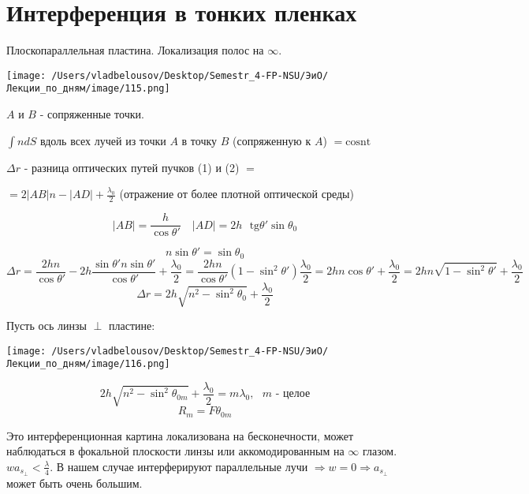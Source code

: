 \documentclass[12pt, a4paper]{report}
\begin{document}
\section{Интерференция в тонких пленках}

Плоскопараллельная пластина. Локализация полос на \( \infty  \). 

\begin{center}
    \texttt{[image: /Users/vladbelousov/Desktop/Semestr\_4-FP-NSU/ЭиО/Лекции\_по\_дням/image/115.png]}
\end{center}
\( A \) и \( B \) - сопряженные точки.

\( \int n d S  \) вдоль всех лучей из точки \( A \) в точку \( B \)  (сопряженную к \( A \)) \( = \mathrm{cosnt}   \) 

\( \Delta r  \)  - разница оптических путей пучков (1) и (2) \( = \) 

\( = 2 |AB|n - \displaystyle  |AD| + \frac{\lambda_0}{2}  \) (отражение от более плотной оптической среды)

\[ |AB | = \frac{h}{\cos \theta' } \quad  |AD| = 2 h \text{ } \mathrm{ tg}   \theta ' \sin  \theta_0 \]  

\[  n \sin \theta ' = \sin \theta_0  \] 
\[ \Delta r = \frac{2hn}{\cos \theta ' }- 2h \frac{\sin  \theta ' n \sin \theta ' }{\cos \theta ' }+ \frac{\lambda_0}{2 }  = \frac{2hn}{\cos  \theta' } (1 - \sin  ^2 \theta ' ) \frac{\lambda_0}{2 }  = 2hn \cos \theta ' + \frac{\lambda_0}{2 }  = 2hn \sqrt{1 - \sin  ^2 \theta ' }   + \frac{\lambda_0}{2 }   \] 
\[ \Delta r = 2 h \sqrt{n ^2 - \sin  ^2 \theta_0 } + \frac{\lambda_0}{2 }  \] 

Пусть ось линзы \( \perp   \) пластине: 

\begin{center}
    \texttt{[image: /Users/vladbelousov/Desktop/Semestr\_4-FP-NSU/ЭиО/Лекции\_по\_дням/image/116.png]}
\end{center}



\[ 2 h \sqrt{n ^2 - \sin  ^2 \theta_{0m }  } + \frac{\lambda_0}{2 }  = m \lambda_0 , \text{ }  m \text{ - целое}  \] 
\[ R_m = F \theta_{0m}  \] 

Это интерференционная картина локализована на бесконечности, может наблюдаться в фокальной плоскости линзы или аккомодированным на \( \infty  \) глазом. \( w a_{s_{\perp } } < \displaystyle \frac{\lambda}{4}   \). В нашем случае интерферируют параллельные лучи \( \Rightarrow w = 0 \Rightarrow a_{s _{\perp  } }   \) может быть очень большим.
\end{document}

